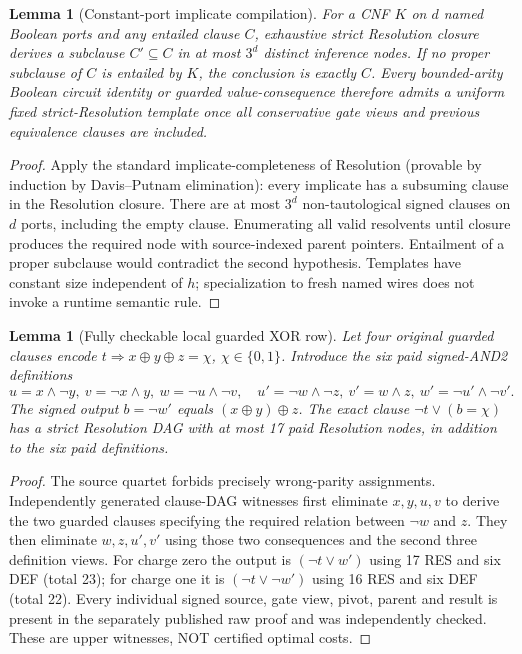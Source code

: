 \documentclass[11pt]{article}
\newtheorem{lemma}[theorem]{Lemma}
\begin{document}
\begin{lemma}[Constant-port implicate compilation]\label{lem:port}
For a CNF $K$ on $d$ named Boolean ports and any entailed clause $C$, exhaustive strict Resolution closure derives a subclause $C'\subseteq C$ in at most $3^d$ distinct inference nodes. If no proper subclause of $C$ is entailed by $K$, the conclusion is exactly $C$. Every bounded-arity Boolean circuit identity or guarded value-consequence therefore admits a uniform fixed strict-Resolution template once all conservative gate views and previous equivalence clauses are included.
\end{lemma}
\begin{proof}
Apply the standard implicate-completeness of Resolution (provable by induction by Davis--Putnam elimination): every implicate has a subsuming clause in the Resolution closure. There are at most $3^d$ non-tautological signed clauses on $d$ ports, including the empty clause. Enumerating all valid resolvents until closure produces the required node with source-indexed parent pointers. Entailment of a proper subclause would contradict the second hypothesis. Templates have constant size independent of $h$; specialization to fresh named wires does not invoke a runtime semantic rule.
\end{proof}

\begin{lemma}[Fully checkable local guarded XOR row]\label{lem:local}
Let four original guarded clauses encode $t\Rightarrow x\oplus y\oplus z=\chi$, $\chi\in\{0,1\}$. Introduce the six paid signed-AND2 definitions
\[
u=x\wedge\neg y,\ v=\neg x\wedge y,\ w=\neg u\wedge\neg v,\quad
u'=\neg w\wedge\neg z,\ v'=w\wedge z,\ w'=\neg u'\wedge\neg v'.
\]
The signed output $b=\neg w'$ equals $(x\oplus y)\oplus z$. The exact clause $\neg t\vee(b=\chi)$ has a strict Resolution DAG with at most 17 paid Resolution nodes, in addition to the six paid definitions.
\end{lemma}
\begin{proof}
The source quartet forbids precisely wrong-parity assignments. Independently generated clause-DAG witnesses first eliminate $x,y,u,v$ to derive the two guarded clauses specifying the required relation between $\neg w$ and $z$. They then eliminate $w,z,u',v'$ using those two consequences and the second three definition views. For charge zero the output is $(\neg t\vee w')$ using 17 RES and six DEF (total 23); for charge one it is $(\neg t\vee\neg w')$ using 16 RES and six DEF (total 22). Every individual signed source, gate view, pivot, parent and result is present in the separately published raw proof and was independently checked. These are upper witnesses, NOT certified optimal costs.
\end{proof}
\end{document}
